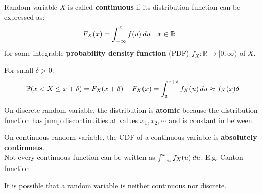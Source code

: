 \documentclass{huhtakm-template-book}
\newcommand{\prob}{\mathbb{P}}
\begin{document}
\begin{defn}
	Random variable $X$ is called \textbf{continuous} if its distribution function can be expressed as:
	\begin{align*}
		F_{X}(x)&=\int_{-\infty}^{x}f(u)\,du & x&\in\mathbb{R}
	\end{align*}
	for some integrable \textbf{probability density function} (PDF) $f_{X}:\mathbb{R}\to [0,\infty)$ of $X$. 
\end{defn}
\begin{rem}
	For small $\delta>0$:
	\begin{equation*}
		\prob(x<X\leq x+\delta)=F_{X}(x+\delta)-F_{X}(x)=\intlu{x}{x+\delta}f_{X}(u)\,du\approx f_{X}(x)\delta
	\end{equation*}
\end{rem}
\begin{rem}
	On discrete random variable, the distribution is \textbf{atomic} because the distribution function has jump discontinuities at values $x_{1},x_{2},\cdots$ and is constant in between.
\end{rem}
\begin{rem}
	On continuous random variable, the CDF of a continuous variable is \textbf{absolutely continuous}.\\
	Not every continuous function can be written as $\int_{-\infty}^{x}f_{X}(u)\,du$. E.g. Canton function
\end{rem}
\begin{rem}
	It is possible that a random variable is neither continuous nor discrete.
\end{rem}
\end{document}
